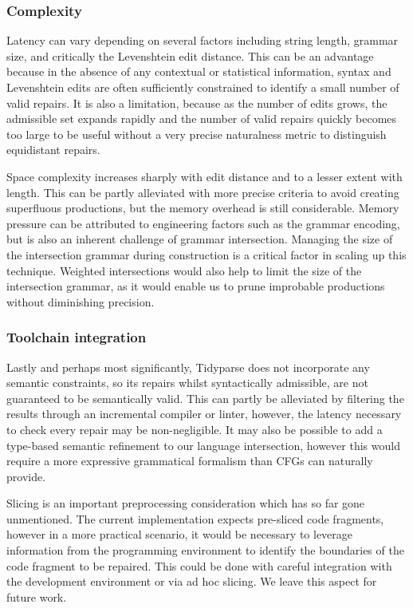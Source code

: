 \documentclass[sigplan,review,acmsmall,nonacm,anonymous]{acmart}\settopmatter{printfolios=false,printccs=false,printacmref=false}
\begin{document}
  \subsubsection{Complexity}

  Latency can vary depending on several factors including string length, grammar size, and critically the Levenshtein edit distance. This can be an advantage because in the absence of any contextual or statistical information, syntax and Levenshtein edits are often sufficiently constrained to identify a small number of valid repairs. It is also a limitation, because as the number of edits grows, the admissible set expands rapidly and the number of valid repairs quickly becomes too large to be useful without a very precise naturalness metric to distinguish equidistant repairs.

  Space complexity increases sharply with edit distance and to a lesser extent with length. This can be partly alleviated with more precise criteria to avoid creating superfluous productions, but the memory overhead is still considerable. Memory pressure can be attributed to engineering factors such as the grammar encoding, but is also an inherent challenge of grammar intersection. Managing the size of the intersection grammar during construction is a critical factor in scaling up this technique. Weighted intersections would also help to limit the size of the intersection grammar, as it would enable us to prune improbable productions without diminishing precision.

  \subsubsection{Toolchain integration}

  Lastly and perhaps most significantly, Tidyparse does not incorporate any semantic constraints, so its repairs whilst syntactically admissible, are not guaranteed to be semantically valid. This can partly be alleviated by filtering the results through an incremental compiler or linter, however, the latency necessary to check every repair may be non-negligible. It may also be possible to add a type-based semantic refinement to our language intersection, however this would require a more expressive grammatical formalism than CFGs can naturally provide.

  Slicing is an important preprocessing consideration which has so far gone unmentioned. The current implementation expects pre-sliced code fragments, however in a more practical scenario, it would be necessary to leverage information from the programming environment to identify the boundaries of the code fragment to be repaired. This could be done with careful integration with the development environment or via ad hoc slicing. We leave this aspect for future work.
\end{document}
